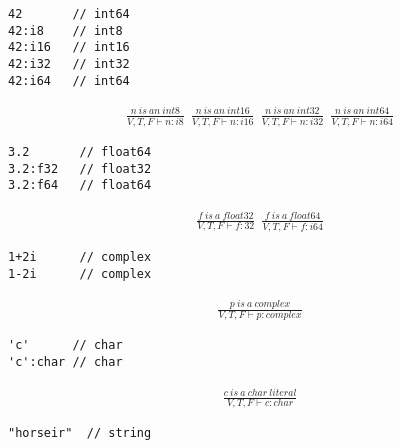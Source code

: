\begin{verbatim}
42       // int64
42:i8    // int8
42:i16   // int16
42:i32   // int32
42:i64   // int64
\end{verbatim}


\begin{align*}
\frac{n\ is\ an\ int8 }{V,T,F\vdash n:i8 }\ \ 
\frac{n\ is\ an\ int16}{V,T,F\vdash n:i16}\ \ 
\frac{n\ is\ an\ int32}{V,T,F\vdash n:i32}\ \ 
\frac{n\ is\ an\ int64}{V,T,F\vdash n:i64}
\end{align*}


\begin{verbatim}
3.2       // float64
3.2:f32   // float32
3.2:f64   // float64
\end{verbatim}


\begin{align*}
\frac{f\ is\ a\ float32}{V,T,F\vdash f:32}\ \ 
\frac{f\ is\ a\ float64}{V,T,F\vdash f:i64}
\end{align*}

\headb{Complex literals.}

\begin{verbatim}
1+2i      // complex
1-2i      // complex
\end{verbatim}


\begin{align*}
\frac{p\ is\ a\ complex}{V,T,F\vdash p:complex}
\end{align*}


\begin{verbatim}
'c'      // char
'c':char // char
\end{verbatim}

\begin{align*}
\frac{c\ is\ a\ char\ literal}{V,T,F\vdash c:char}
\end{align*}


\begin{verbatim}
"horseir"  // string
\end{verbatim}

